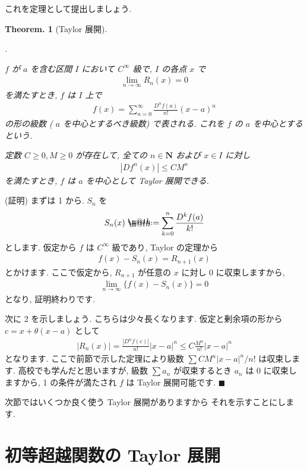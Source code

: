\documentclass[openany, a4paper, oneside]{jsbook}
\makeatletter
\newcounter{enum2}
\renewenvironment{enumerate}{%
\begin{list}%
{%
\arabic{enum2}.\ \,%
}%
{%
\usecounter{enum2}
\setlength{\itemindent}{0pt}%
\setlength{\leftmargin}{15pt}%
\setlength{\rightmargin}{0pt}%
\setlength{\labelsep}{0pt}%
\setlength{\labelwidth}{6pt}%
\setlength{\itemsep}{0pt}%
\setlength{\parsep}{0pt}%
\setlength{\listparindent}{0pt}%
}
}{%
\end{list}%
}
\newcommand*{\defeq}{\mathrel{\rlap{%
\raisebox{0.3ex}{$\m@th\cdot$}}%
\raisebox{-0.3ex}{$\m@th\cdot$}}%
=}
\theoremstyle{break}
\theoremstyle{breakdefn}
\newtheorem{thm}{Theorem.}[section]
\newcommand{\abs}[1]{\left|#1\right|}
\makeatother
\begin{document}
これを定理として提出しましょう.
\begin{thm}[Taylor 展開]
 \begin{enumerate}
  \item $f$ が $a$ を含む区間 $I$ において $C^{\infty}$ 級で,  $I$ の各点 $x$ で
   \begin{align}
    \lim_{n \to \infty}R_n (x)=0
   \end{align}
   を満たすとき,  $f$ は $I$ 上で
   \begin{align}
    f (x)
    =
    \sum_{n=0}^{\infty}\frac{D^n f (a)}{n!}(x-a)^n
   \end{align}
   の形の級数 ( $a$ を中心とするべき級数) で表される.
   これを $f$ の $a$ を中心とするという.
  \item 定数 $C\geq 0,M\geq 0$ が存在して, 全ての $n \in \bm{N}$ および
   $x\in I$ に対し
   \begin{align}
   \abs{Df^n (x)}\leq CM^n
   \end{align}
   を満たすとき,  $f$ は $a$ を中心として Taylor 展開できる.
 \end{enumerate}
\end{thm}
(証明) まずは 1 から.  $S_n$ を
    \begin{align}
        S_n (x)\defeq \sum_{k=0}^n \frac{D^k f (a)}{k!}
    \end{align}
とします. 仮定から $f$ は $C^{\infty}$ 級であり, Taylor の定理から
    \begin{align}
        f (x)-S_n (x)=R_{n+1}(x)
    \end{align}
とかけます. ここで仮定から,  $R_{n+1}$ が任意の $x$ に対し $0$ に収束しますから,
    \begin{align}
        \lim_{n \to \infty}\{ f (x)-S_n (x) \} =0
    \end{align}
となり, 証明終わりです.

次に 2 を示しましょう. こちらは少々長くなります.
仮定と剰余項の形から $c=x+\theta (x-a)$ として
    \begin{align}
        |R_n (x)|=\frac{|D^nf (c)|}{n!}|x-a|^n \leq C\frac{M^n}{n!}|x-a|^n
    \end{align}
となります. ここで前節で示した定理により級数
 $\sum CM^n|x-a|^n/n!$ は収束します.
高校でも学んだと思いますが,
級数 $\sum a_n$ が収束するとき $a_n$ は 0 に収束しますから, 1 の条件が満たされ
 $f$ は Taylor 展開可能です.  $\blacksquare$

次節ではいくつか良く使う Taylor 展開がありますから
それを示すことにします.
\section{初等超越関数の Taylor 展開}
\end{document}
